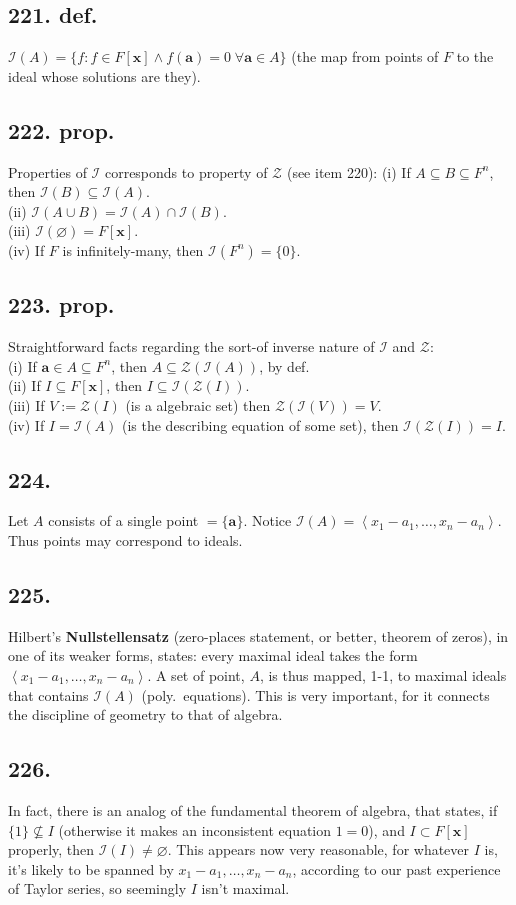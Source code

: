 \documentclass[12pt]{article}
\newcommand{\V}\mathbf%
\newcommand{\Ev}\forall%
\newcommand{\Ab}[1]{ \left\langle #1 \right\rangle } %
\newcommand{\SF}[1]{ \mathscr{#1} }%
\newcommand{\Ss}[1]{\textsf{\bfseries{#1}}}%
\newcommand{\Nl}{\\ \indent} %
\begin{document}
\subsection*{221. def.} \(\SF{I}(A)= \{f: f \in F[\V{x}] \land f(\V{a}) =0\; \Ev \V{a} \in A\}\) (the map from points of \(F\) to the ideal whose solutions are they).

\subsection*{222. prop.} Properties of \(\SF{I}\) corresponds to property of \(\SF{Z}\) (see item 220):
(i) If \(A \subseteq B \subseteq F^n\), then \(\SF{I}(B) \subseteq \SF{I}(A)\). \Nl
(ii) \(\SF{I}(A \cup B) =\SF{I}(A) \cap \SF{I}(B)\). \Nl
(iii) \(\SF{I}(\varnothing) =F[\V{x}]\). \Nl
(iv) If \(F\) is infinitely-many, then \(\SF{I}(F^n) =\{0\}\). 

\subsection*{223. prop.} Straightforward facts regarding the sort-of inverse nature of \(\SF{I}\) and \(\SF{Z}\): \Nl
(i) If \(\V{a} \in A \subseteq F^n\), then \(A \subseteq \SF{Z}(\SF{I}(A))\), by def. \Nl
(ii) If \(I \subseteq F[\V{x}]\), then \(I \subseteq \SF{I}(\SF{Z}(I))\). \Nl
(iii) If \(V := \SF{Z}(I)\) (is a algebraic set) then \(\SF{Z}(\SF{I}(V)) =V\). \Nl
(iv) If \(I =\SF{I}(A)\) (is the describing equation of some set), then \(\SF{I}(\SF{Z}(I)) =I\). 

\subsection*{224.} Let \(A\) consists of a single point \(=\{\V{a}\}\). 
Notice \(\SF{I}(A) =\Ab{x_1-a_1,\dotsc,x_n-a_n}\). 
Thus points may correspond to ideals. 

\subsection*{225.} Hilbert's \Ss{Nullstellensatz} (zero-places statement, or better, theorem of zeros), in one of its weaker forms, states: every maximal ideal takes the form \(\Ab{x_1-a_1,\dotsc,x_n-a_n}\). 
A set of point, \(A\), is thus mapped, 1-1, to maximal ideals that contains \(\SF{I}(A)\) (poly.\ equations). 
This is very important, for it connects the discipline of geometry to that of algebra. 

\subsection*{226.} In fact, there is an analog of the fundamental theorem of algebra, that states, if \(\{1\} \not\subseteq I\) (otherwise it makes an inconsistent equation \(1=0\)), and \(I \subset F[\V{x}]\) properly, then \(\SF{I}(I) \neq \varnothing\). 
This appears now very reasonable, for whatever \(I\) is, it's likely to be spanned by \(x_1-a_1,\dotsc,x_n-a_n\), according to our past experience of Taylor series, so seemingly \(I\) isn't maximal. 
\end{document}

